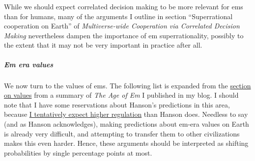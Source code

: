 \documentclass[]{article}
\let\oldsubparagraph\subparagraph
\renewcommand{\subparagraph}[1]{\oldsubparagraph{#1}\mbox{}}
\begin{document}
While we should expect correlated decision making to be more relevant
for ems than for humans, many of the arguments I outline in section
``Superrational cooperation on Earth'' of \emph{Multiverse-wide Cooperation via
Correlated Decision Making} 
nevertheless dampen the importance of em
superrationality, possibly to the extent that it may not be very
important in practice after all.

\subparagraph{Em era values}\label{em-era-values}

We now turn to the values of ems. The following list is expanded from
the
\href{https://casparoesterheld.com/2016/08/30/the-age-of-em-summary-of-policy-relevant-information/\#Values}{section
on values} from a summary of \emph{The Age of Em} I published in my blog.
I should note that I have some reservations about Hanson's predictions
in this area, because
\href{https://casparoesterheld.com/2016/08/30/the-age-of-em-summary-of-policy-relevant-information/\#regulation}{I
tentatively expect higher regulation} than Hanson does. Needless to say
(and as Hanson acknowledges), making predictions about em-era values on
Earth is already very difficult, and attempting to transfer them to
other civilizations makes this even harder. Hence, these arguments
should be interpreted as shifting probabilities by single percentage
points at most.
\end{document}

